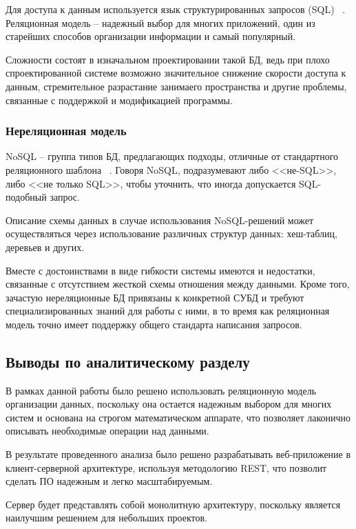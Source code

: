 \documentclass[a4paper,14pt]{extarticle}
\begin{document}
 
 	Для доступа к данным используется язык структурированных запросов (SQL) ~\cite{sql}. Реляционная модель – надежный выбор для многих приложений, один из старейших способов организации информации и самый популярный.
 	
 	Сложности состоят в изначальном проектировании такой БД, ведь при плохо спроектированной системе возможно значительное снижение скорости доступа к данным, стремительное разрастание занимаего пространства и другие проблемы, связанные с поддержкой и модификацией программы.

 	\subsubsection{Нереляционная модель}
 	
 	NoSQL – группа типов БД, предлагающих подходы, отличные от стандартного реляционного шаблона ~\cite{nosql}. Говоря NoSQL, подразумевают либо <<не-SQL>>, либо <<не только SQL>>, чтобы уточнить, что иногда допускается SQL-подобный запрос.
 	
 	Описание схемы данных в случае использования NoSQL-решений может осуществляться через использование различных структур данных: хеш-таблиц, деревьев и других.
 	
 	Вместе с достоинствами в виде гибкости системы имеются и недостатки, связанные с отсутствием жесткой схемы отношения между данными. Кроме того, зачастую нереляционные БД привязаны к конкретной СУБД и требуют специализированных знаний для работы с ними, в то время как реляционная модель точно имеет поддержку общего стандарта написания запросов.
 	
 	\subsection*{Выводы по аналитическому разделу}
 	
 	В рамках данной работы было решено использовать реляционную модель организации данных, поскольку она остается надежным выбором для многих систем и основана на строгом математическом аппарате, что позволяет лаконично описывать необходимые операции над данными.
 	
 	В результате проведенного анализа было решено разрабатывать веб-приложение в клиент-серверной архитектуре, используя методологию REST, что позволит сделать ПО надежным и легко масштабируемым.
 	
 	Сервер будет представлять собой монолитную архитектуру, поскольку является наилучшим решением для небольших проектов.
 	
\end{document}
